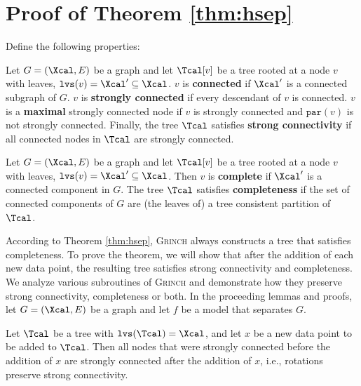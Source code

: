 \documentclass{article} \usepackage[utf8]{inputenc} \usepackage[T1]{fontenc}    \usepackage{hyperref}       \usepackage{url}            \usepackage{booktabs}       \usepackage{amsfonts}       \usepackage{nicefrac}       \usepackage{microtype}      \usepackage{geometry}
\newcommand{\alg}{\textsc{Grinch}\xspace}
\newcommand{\record}{data point\xspace}
\newcommand{\lvs}[1]{\ensuremath{\texttt{lvs}(#1)}}
\newcommand{\parent}[1]{\ensuremath{\texttt{par}}(#1)\xspace}
\begin{document}



\newpage

\begin{appendix}
\label{sec:appendix}

\section{Proof of Theorem \ref{thm:hsep}}
Define the following properties:

\begin{definition}
\label{def:strong}
Let $G=(\Xcal,E)$ be a graph and let $\Tcal[v]$ be a tree rooted at a
node $v$ with leaves, $\lvs{v}=\Xcal' \subseteq \Xcal$.  $v$ is
\textbf{connected} if $\Xcal'$ is a connected subgraph of $G$. $v$ is
\textbf{strongly connected} if every descendant of $v$ is connected. $v$
is a \textbf{maximal} strongly connected node if $v$ is strongly
connected and $\parent{v}$ is not strongly connected. Finally, the
tree $\Tcal$ satisfies \textbf{strong connectivity} if all connected
nodes in $\Tcal$ are strongly connected.
\end{definition}

\begin{definition}[Completeness]
\label{def:strong}
Let $G=(\Xcal,E)$ be a graph and let $\Tcal[v]$ be a tree rooted at a
node $v$ with leaves, $\lvs{v}=\Xcal' \subseteq \Xcal$.  Then $v$ is
\textbf{complete} if $\Xcal'$ is a connected component in $G$. The tree
$\Tcal$ satisfies \textbf{completeness} if the set of connected components
of $G$ are (the leaves of) a tree consistent partition of $\Tcal$.
\end{definition}

According to Theorem \ref{thm:hsep}, \alg always constructs a tree
that satisfies completeness. To prove the theorem, we will show that
after the addition of each new \record, the resulting tree satisfies
strong connectivity and completeness. We analyze various subroutines
of \alg and demonstrate how they preserve strong connectivity,
completeness or both.  In the proceeding lemmas and proofs, let
$G=(\Xcal, E)$ be a graph and let $f$ be a model that separates $G$.

\begin{lemma}
\label{thm:rotate}
Let $\Tcal$ be a tree with $\lvs{\Tcal} = \Xcal$, and let $x$ be a new
\record to be added to $\Tcal$. Then all nodes that were strongly
connected before the addition of $x$ are strongly connected after the
addition of $x$, i.e., rotations preserve strong connectivity.
\end{lemma}


\end{appendix}
\end{document}

